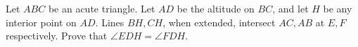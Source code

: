 Let $ABC$ be an acute triangle. Let $AD$ be the altitude on $BC$,  and let $H$ be any interior point on $AD$. Lines $BH,CH$,  when extended, intersect $AC,AB$ at $E,F$ respectively. Prove that $\angle EDH=\angle FDH$.